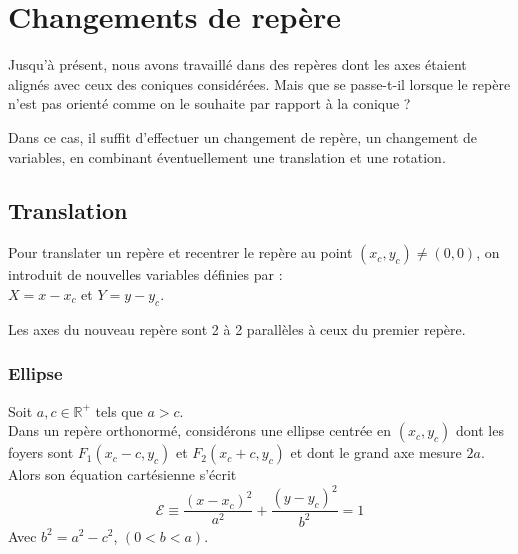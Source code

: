 \newpage
\section{Changements de repère}
Jusqu’à présent, nous avons travaillé dans des repères dont les axes étaient alignés avec ceux des coniques considérées.
Mais que se passe-t-il lorsque le repère n’est pas orienté comme on le souhaite par rapport à la conique ?

Dans ce cas, il suffit d’effectuer un changement de repère, un changement de variables, en combinant éventuellement une translation et une rotation.

\subsection{Translation}\label{section:translation}
Pour translater un repère et recentrer le repère au point $(x_c, y_c) \neq (0,0)$, on introduit de nouvelles variables définies par :\\
$X = x - x_c$ et  $Y = y-y_c$. 

Les axes du nouveau repère sont 2 à 2 parallèles à ceux du premier repère.
\subsubsection{Ellipse}
\begin{tcolorbox}[colback=cyan!5, colframe=cyan!70!blue, title=Equation cartésienne d'une ellipse de centre {$(x_c, y_c)$} (sans rotation).]
Soit $a, c \in \mathbb{R}^+$ tels que $a > c$.\\
 Dans un repère orthonormé, 
 considérons une ellipse centrée en $(x_c, y_c)$ dont les foyers sont 
 $F_1 (x_c - c,y_c)$ et $F_2 (x_c+c,y_c)$ et dont le grand axe mesure $2a$.\\ Alors son équation cartésienne s'écrit\\
\begin{equation}
\mathcal{E} \equiv \dfrac{(x-x_c)^2}{a^2} + \dfrac{(y-y_c)^2}{b^2} = 1
\end{equation}
Avec $b^2 = a^2 - c^2$, $(0<b<a)$.
\end{tcolorbox}

